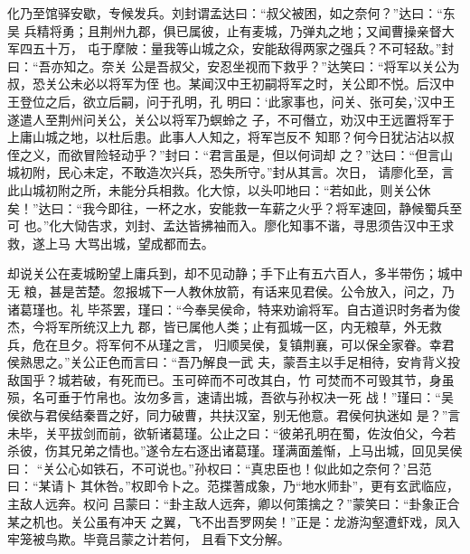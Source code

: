 化乃至馆驿安歇，专候发兵。刘封谓孟达曰：“叔父被困，如之奈何？”达曰：“东吴
兵精将勇；且荆州九郡，俱已属彼，止有麦城，乃弹丸之地；又闻曹操亲督大军四五十万，
屯于摩陂：量我等山城之众，安能敌得两家之强兵？不可轻敌。”封曰：“吾亦知之。奈关
公是吾叔父，安忍坐视而下救乎？”达笑曰：“将军以关公为叔，恐关公未必以将军为侄
也。某闻汉中王初嗣将军之时，关公即不悦。后汉中王登位之后，欲立后嗣，问于孔明，孔
明曰：‘此家事也，问关、张可矣，’汉中王遂遣人至荆州问关公，关公以将军乃螟蛉之
子，不可僭立，劝汉中王远置将军于上庸山城之地，以杜后患。此事人人知之，将军岂反不
知耶？何今日犹沾沾以叔侄之义，而欲冒险轻动乎？”封曰：“君言虽是，但以何词却
之？”达曰：“但言山城初附，民心未定，不敢造次兴兵，恐失所守。”封从其言。次日，
请廖化至，言此山城初附之所，未能分兵相救。化大惊，以头叩地曰：“若如此，则关公休
矣！”达曰：“我今即往，一杯之水，安能救一车薪之火乎？将军速回，静候蜀兵至可
也。”化大恸告求，刘封、孟达皆拂袖而入。廖化知事不谐，寻思须告汉中王求救，遂上马
大骂出城，望成都而去。

却说关公在麦城盼望上庸兵到，却不见动静；手下止有五六百人，多半带伤；城中无
粮，甚是苦楚。忽报城下一人教休放箭，有话来见君侯。公令放入，问之，乃诸葛瑾也。礼
毕茶罢，瑾曰：“今奉吴侯命，特来劝谕将军。自古道识时务者为俊杰，今将军所统汉上九
郡，皆已属他人类；止有孤城一区，内无粮草，外无救兵，危在旦夕。将军何不从瑾之言，
归顺吴侯，复镇荆襄，可以保全家眷。幸君侯熟思之。”关公正色而言曰：“吾乃解良一武
夫，蒙吾主以手足相待，安肯背义投敌国乎？城若破，有死而已。玉可碎而不可改其白，竹
可焚而不可毁其节，身虽殒，名可垂于竹帛也。汝勿多言，速请出城，吾欲与孙权决一死
战！”瑾曰：“吴侯欲与君侯结秦晋之好，同力破曹，共扶汉室，别无他意。君侯何执迷如
是？”言未毕，关平拔剑而前，欲斩诸葛瑾。公止之曰：“彼弟孔明在蜀，佐汝伯父，今若
杀彼，伤其兄弟之情也。”遂令左右逐出诸葛瑾。瑾满面羞惭，上马出城，回见吴侯曰：
“关公心如铁石，不可说也。”孙权曰：“真忠臣也！似此如之奈何？’吕范曰：“某请卜
其休咎。”权即令卜之。范揲蓍成象，乃“地水师卦”，更有玄武临应，主敌人远奔。权问
吕蒙曰：“卦主敌人远奔，卿以何策擒之？”蒙笑曰：“卦象正合某之机也。关公虽有冲天
之翼，飞不出吾罗网矣！”正是：龙游沟壑遭虾戏，凤入牢笼被鸟欺。毕竟吕蒙之计若何，
且看下文分解。